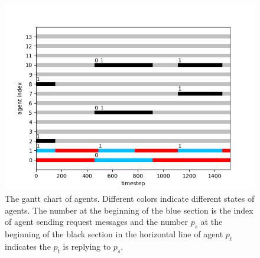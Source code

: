 \documentclass[journal]{IEEEtran}
\begin{document}
\begin{figure}[h]	
\centering  	
\includegraphics[width=1\linewidth]{simulate1/gante_no_grid.png}
\caption{The gantt chart of agents. Different colors indicate different states of agents. The number at the beginning of the blue section is the index of agent sending request messages and the number $p_s$ at the beginning of the black section in the horizontal line of agent $p_t$ indicates the $p_t$ is replying to $p_s$.}
\label{Gantt}
\end{figure}

%
\end{document}
